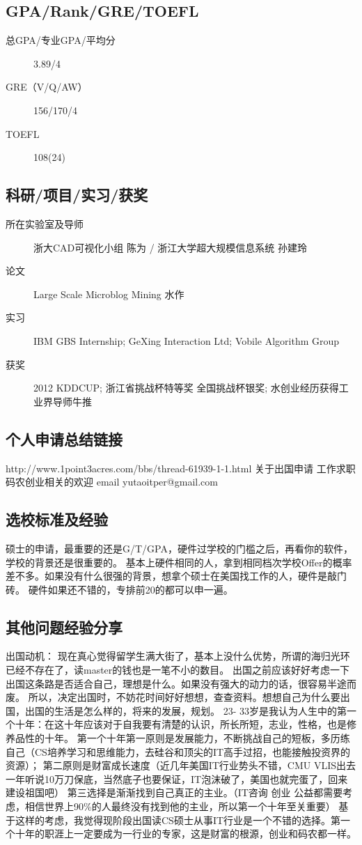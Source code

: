 \documentclass[11pt,fleqn,openany]{book} %
\begin{document}
\subsection*{GPA/Rank/GRE/TOEFL}
\begin{description}
\item[总GPA/专业GPA/平均分] 3.89/4
\item[GRE（V/Q/AW）] 156/170/4
\item[TOEFL] 108(24)
\end{description}

\subsection*{科研/项目/实习/获奖}
\begin{description}
\item[所在实验室及导师] 浙大CAD可视化小组 陈为 /  浙江大学超大规模信息系统  孙建玲
\item[论文] Large Scale Microblog Mining 水作
\item[实习] IBM GBS Internship; GeXing Interaction Ltd; Vobile Algorithm Group
\item[获奖] 2012 KDDCUP; 浙江省挑战杯特等奖 全国挑战杯银奖; 水创业经历获得工业界导师牛推
\end{description}
\subsection*{个人申请总结链接}
http://www.1point3acres.com/bbs/thread-61939-1-1.html
关于出国申请 工作求职 码农创业相关的欢迎 email yutaoitper@gmail.com
\subsection*{选校标准及经验}
硕士的申请，最重要的还是G/T/GPA，硬件过学校的门槛之后，再看你的软件，学校的背景还是很重要的。
基本上硬件相同的人，拿到相同档次学校Offer的概率差不多。如果没有什么很强的背景，想拿个硕士在美国找工作的人，硬件是敲门砖。
硬件如果还不错的，专排前20的都可以申一遍。
\subsection*{其他问题经验分享}
出国动机：  
现在真心觉得留学生满大街了，基本上没什么优势，所谓的海归光环已经不存在了，读master的钱也是一笔不小的数目。
出国之前应该好好考虑一下出国这条路是否适合自己，理想是什么。如果没有强大的动力的话，很容易半途而废。
所以，决定出国时，不妨花时间好好想想，查查资料。想想自己为什么要出国，出国的生活是怎么样的，将来的发展，规划。
23- 33岁是我认为人生中的第一个十年：在这十年应该对于自我要有清楚的认识，所长所短，志业，性格，也是修养品性的十年。
第一个十年第一原则是发展能力，不断挑战自己的短板，多历练自己（CS培养学习和思维能力，去硅谷和顶尖的IT高手过招，也能接触投资界的资源）；
第二原则是财富成长速度（近几年美国IT行业势头不错，CMU VLIS出去一年听说10万刀保底，当然底子也要保证，IT泡沫破了，美国也就完蛋了，回来建设祖国吧）
第三选择是渐渐找到自己真正的主业。（IT咨询 创业 公益都需要考虑，相信世界上90\%的人最终没有找到他的主业，所以第一个十年至关重要）
基于这样的考虑，我觉得现阶段出国读CS硕士从事IT行业是一个不错的选择。第一个十年的职涯上一定要成为一行业的专家，这是财富的根源，创业和码农都一样。
\clearpage
\end{document}
